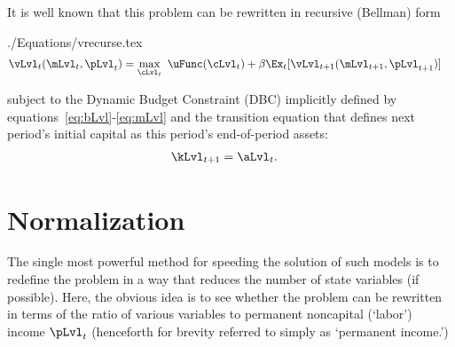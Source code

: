 \documentclass[titlepage, headings=optiontotocandhead]{\econtex}
\begin{document}
It is well known that this problem can be rewritten in recursive (Bellman) form
\begin{verbatimwrite}{./Equations/vrecurse.tex}
  \begin{equation}\begin{gathered}\begin{aligned}
        {\vLvl}
_{t}(\mLvl_{t},\pLvl_{t})  & = \max_{\cLvl_{t}}~ \uFunc(\cLvl_{t}) + {\DiscAlt}\Ex_{t}[ {\vLvl}
_{t+1}({\mLvl}_{t+1},\pLvl_{t+1})]\label{eq:vrecurse}
      \end{aligned}\end{gathered}\end{equation}
\end{verbatimwrite}
\unskip
subject to the Dynamic Budget Constraint (DBC) implicitly defined by equations~\eqref{eq:bLvl}-\eqref{eq:mLvl}
and the transition equation that defines next period's initial capital as this period's end-of-period assets:
\begin{equation}\begin{gathered}\begin{aligned}
      \kLvl_{t+1} & = \aLvl_{t}. \label{eq:transition.state}
\end{aligned}\end{gathered}\end{equation}

\hypertarget{Normalization}{}
\section{Normalization}\label{sec:normalization}
 The single most powerful method for speeding the solution of such models is to redefine the problem in a way that reduces the number of state variables (if possible).  Here, the obvious idea is to see whether the problem can be rewritten in terms of the ratio of various variables to permanent noncapital (`labor') income $\pLvl_{t}$ (henceforth for brevity referred to simply as `permanent income.')
\end{document}
